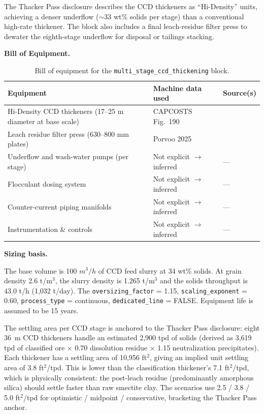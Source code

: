 The Thacker Pass disclosure describes the CCD thickeners as ``Hi-Density'' units, achieving a denser underflow ($\sim$33 wt\% solids per stage) than a conventional high-rate thickener. The block also includes a final leach-residue filter press to dewater the eighth-stage underflow for disposal or tailings stacking.

\medskip
\noindent\textbf{Bill of Equipment.}\quad

\begin{table}[h!]
\caption{Bill of equipment for the \texttt{multi\_stage\_ccd\_thickening} block.}
\centering
\begin{tabular}{>{\raggedright\arraybackslash}p{5.2cm}
				>{\raggedright\arraybackslash}p{4cm}
				>{\raggedright\arraybackslash}p{4.5cm}}
\toprule
\textbf{Equipment} & \textbf{Machine data used} & \textbf{Source(s)} \\
\midrule
8 Hi-Density CCD thickeners (17--25 m diameter at base scale) & CAPCOSTS Fig.~190 & \citet{mularCAPCOSTSHandbookEstimating1998} \\
Leach residue filter press (630--800 mm plates) & Porvoo 2025 & \citet{porvooIndustrialFilterPress2025} \\
Underflow and wash-water pumps (per stage) & Not explicit $\rightarrow$ inferred & --- \\
Flocculant dosing system & Not explicit $\rightarrow$ inferred & --- \\
Counter-current piping manifolds & Not explicit $\rightarrow$ inferred & --- \\
Instrumentation \& controls & Not explicit $\rightarrow$ inferred & --- \\
\bottomrule
\end{tabular}
\end{table}

\medskip
\noindent\textbf{Sizing basis.}\quad

The base volume is 100 $\si{m^3/h}$ of CCD feed slurry at 34 wt\% solids. At grain density 2.6 t/m$^3$, the slurry density is 1.265 t/m$^3$ and the solids throughput is 43.0 t/h (1,032 t/day). The \texttt{oversizing\_factor} = 1.15, \texttt{scaling\_exponent} = 0.60, \texttt{process\_type} = continuous, \texttt{dedicated\_line} = FALSE. Equipment life is assumed to be 15 years.

The settling area per CCD stage is anchored to the Thacker Pass disclosure: eight 36~m CCD thickeners handle an estimated 2,900 tpd of solids (derived as 3,619 tpd of classified ore $\times$ 0.70 dissolution residue $\times$ 1.15 neutralization precipitates). Each thickener has a settling area of 10,956 ft$^2$, giving an implied unit settling area of 3.8 ft$^2$/tpd. This is lower than the classification thickener's 7.1 ft$^2$/tpd, which is physically consistent: the post-leach residue (predominantly amorphous silica) should settle faster than raw smectite clay. The scenarios use 2.5 / 3.8 / 5.0 ft$^2$/tpd for optimistic / midpoint / conservative, bracketing the Thacker Pass anchor.

